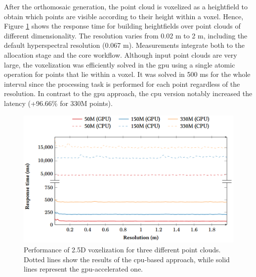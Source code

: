 After the orthomosaic generation, the point cloud is voxelized as a heightfield to obtain which points are visible according to their height within a voxel. Hence, Figure \ref{fig:hyper_voxelization_results} shows the response time for building heightfields over point clouds of different dimensionality. The resolution varies from 0.02 \si{\meter} to 2 \si{\meter}, including the default hyperspectral resolution (0.067 \si{\meter}). Measurements integrate both to the allocation stage and the core workflow. Although input point clouds are very large, the voxelization was efficiently solved in the \acrshort{gpu} using a single atomic operation for points that lie within a voxel. It was solved in 500 \si{\milli\second} for the whole interval since the processing task is performed for each point regardless of the resolution. In contrast to the \acrshort{gpu} approach, the \acrshort{cpu} version notably increased the latency (+96.66\% for 330M points).

\begin{figure}[bt]
    \centering
    \includegraphics[width=\linewidth]{figs/hyper_point_cloud/voxelization_results.png}
	\caption{Performance of 2.5D voxelization for three different point clouds. Dotted lines show the results of the \acrshort{cpu}-based approach, while solid lines represent the \acrshort{gpu}-accelerated one. }
	\label{fig:hyper_voxelization_results}
\end{figure}

